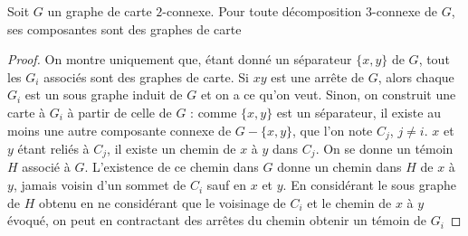 \documentclass{scrartcl}
\begin{document}
\begin{flushleft}
\begin{prop}\label{3connCompCarte}
    Soit $G$ un graphe de carte $2$-connexe. Pour toute décomposition $3$-connexe de $G$, ses composantes sont des graphes de carte
\end{prop}

\begin{proof}
    On montre uniquement que, étant donné un séparateur $\{x,y\}$ de $G$, tout les $G_i$ associés sont des graphes de carte.
    Si $xy$ est une arrête de $G$, alors chaque $G_i$ est un sous graphe induit de $G$ et on a ce qu'on veut. Sinon, on construit une
    carte à $G_i$ à partir de celle de $G$ : comme $\{x,y\}$ est un séparateur, il existe au moins une autre composante connexe de
    $G - \{x,y\}$, que l'on note $C_j$, $j \neq i$. $x$ et $y$ étant reliés à $C_j$, il existe un chemin de $x$ à $y$ dans $C_j$.
    On se donne un témoin $H$ associé à $G$. L'existence de ce chemin dans $G$ donne un chemin dans $H$ de $x$ à $y$, jamais voisin
    d'un sommet de $C_i$ sauf en $x$ et $y$. En considérant le sous graphe de $H$ obtenu en ne considérant que le voisinage de $C_i$ et le chemin
    de $x$ à $y$ évoqué, on peut en contractant des arrêtes du chemin obtenir un témoin de $G_i$
\end{proof}

\begin{comment}

\subsection{Contractibilité des arrêtes}

On aimerait donner une condition nécessaire et suffisante permettant de contracter les arrêtes d'un graphe de carte.
Certaines arrêtes sont clairement contractibles, comme celles représentées par $2$ régions partageant une courbe, d'autres ne le sont
pas, comme l'arrête $xy$ du graphe $G_{pch}$ \ref{Gpch}, qui est un graphe de carte.
On dénotera par $\mathcal{G}_{pch}$ l'ensemble des graphes obtenu depuis $G_{pch}$,
en ajoutant des arrêtes entre les sommets distincts de $a, b, c$

\begin{figure}[h]
    \caption{Le graphe $G_{pch}$}\label{Gpch}
    \begin{center}
        \begin{tikzpicture}[auto]
            \begin{scope}[every node/.style={circle, draw}]
                \node (a) {$a$};
                \node (b) [right = 20mm of a] {$b$};
                \node (c) [right = of b] {$c$};
                \node (x) [below left = 12mm and 5mm of a] {$x$};
                \node (y) [below right = 12mm and 5mm of a] {$y$};
                \node (u) [below = of b] {$u$};
                \node (v) [below = of c] {$v$};


\end{comment}
\end{flushleft}
\end{document}
